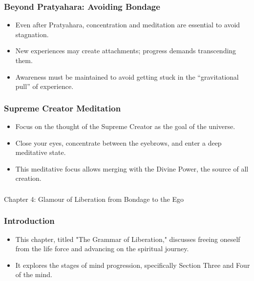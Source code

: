 \begin{frame}[fragile]\frametitle{Beyond Pratyahara: Avoiding Bondage}
    \begin{itemize}
        \item Even after Pratyahara, concentration and meditation are essential to avoid stagnation.
        \item New experiences may create attachments; progress demands transcending them.
        \item Awareness must be maintained to avoid getting stuck in the “gravitational pull” of experience.
    \end{itemize}
\end{frame}

\begin{frame}[fragile]\frametitle{Supreme Creator Meditation}
    \begin{itemize}
        \item Focus on the thought of the Supreme Creator as the goal of the universe.
        \item Close your eyes, concentrate between the eyebrows, and enter a deep meditative state.
        \item This meditative focus allows merging with the Divine Power, the source of all creation.
    \end{itemize}
\end{frame}


\begin{frame}[fragile]\frametitle{}
\begin{center}
{\Large Chapter 4: Glamour of Liberation from Bondage to the Ego }
\end{center}
\end{frame}

\begin{frame}[fragile]\frametitle{Introduction}
    \begin{itemize}
        \item This chapter, titled "The Grammar of Liberation," discusses freeing oneself from the life force and advancing on the spiritual journey.
        \item It explores the stages of mind progression, specifically Section Three and Four of the mind.
    \end{itemize}
\end{frame}


